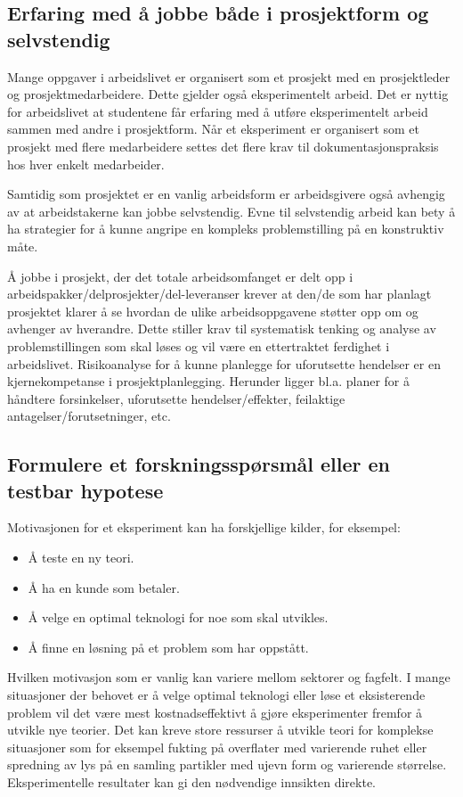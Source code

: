 \documentclass{article}
\begin{document}
\subsection{Erfaring med å jobbe både i prosjektform og selvstendig}
Mange oppgaver i arbeidslivet er organisert som et prosjekt med en prosjektleder og prosjektmedarbeidere.
Dette gjelder også eksperimentelt arbeid.
Det er nyttig for arbeidslivet at studentene får erfaring med å utføre eksperimentelt arbeid sammen med andre i prosjektform.
Når et eksperiment er organisert som et prosjekt med flere medarbeidere settes det flere krav til dokumentasjonspraksis hos hver enkelt medarbeider.

Samtidig som prosjektet er en vanlig arbeidsform er arbeidsgivere også avhengig av at arbeidstakerne kan jobbe selvstendig.
Evne til selvstendig arbeid kan bety å ha strategier for å kunne angripe en kompleks problemstilling på en konstruktiv måte.

Å jobbe i prosjekt, der det totale arbeidsomfanget er delt opp i arbeidspakker/delprosjekter/del-leveranser krever at den/de som har planlagt prosjektet klarer å se hvordan de ulike arbeidsoppgavene støtter opp om og avhenger av hverandre.
Dette stiller krav til systematisk tenking og analyse av problemstillingen som skal løses og vil være en ettertraktet ferdighet i arbeidslivet.
Risikoanalyse for å kunne planlegge for uforutsette hendelser er en kjernekompetanse i prosjektplanlegging.
Herunder ligger bl.a. planer for å håndtere forsinkelser, uforutsette hendelser/effekter, feilaktige antagelser/forutsetninger, etc.

\subsection{Formulere et forskningsspørsmål eller en testbar hypotese}
Motivasjonen for et eksperiment kan ha forskjellige kilder, for eksempel:
\begin{itemize}
  \item Å teste en ny teori.
  \item Å ha en kunde som betaler.
  \item Å velge en optimal teknologi for noe som skal utvikles.
  \item Å finne en løsning på et problem som har oppstått.
\end{itemize}

Hvilken motivasjon som er vanlig kan variere mellom sektorer og fagfelt.
I mange situasjoner der behovet er å velge optimal teknologi eller løse et eksisterende problem vil det være mest kostnadseffektivt å gjøre eksperimenter fremfor å utvikle nye teorier.
Det kan kreve store ressurser å utvikle teori for komplekse situasjoner som for eksempel fukting på overflater med varierende ruhet eller spredning av lys på en samling partikler med ujevn form og varierende størrelse.
Eksperimentelle resultater kan gi den nødvendige innsikten direkte.
\end{document}
